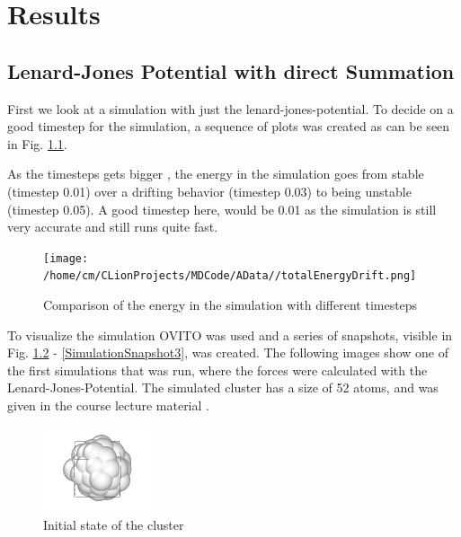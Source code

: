 \chapter{Results}

\section{Lenard-Jones Potential with direct Summation}

First we look at a simulation with just the lenard-jones-potential. To decide on a good timestep for the simulation, a sequence of plots was created as can be seen in Fig. \ref{SimWithTimestep}.
\par 
As the timesteps gets bigger , the energy in the simulation goes from stable (timestep 0.01) over a drifting behavior (timestep 0.03) to being unstable (timestep 0.05). A good timestep here, would be 0.01 as the simulation is still very accurate and still runs quite fast. 

\begin{figure}
	\begin{center}
		\texttt{[image: /home/cm/CLionProjects/MDCode/AData//totalEnergyDrift.png]}
	\end{center}
	\caption[Comparison of the energy in the simulation with different timesteps]{Comparison of the energy in the simulation with different timesteps}
	\label{SimWithTimestep}
\end{figure}
\par
To visualize the simulation OVITO \cite{ovito} was used and a series of snapshots, visible in Fig. \ref{SimulationSnapshot1} - \ref{SimulationSnapshot3}, was created. The following images show one of the first simulations that was run, where the forces were calculated with the Lenard-Jones-Potential. The simulated cluster has a size of 52 atoms, and was given in the course lecture material \cite{molDymCourse}.
\begin{figure}
	\begin{center}
		\includegraphics[scale= 0.65]{Figure/1ImageS.png}
	\end{center}
	\caption[Simulation Snapshot 1]{Initial state of the cluster}
	\label{SimulationSnapshot1}
\end{figure}

